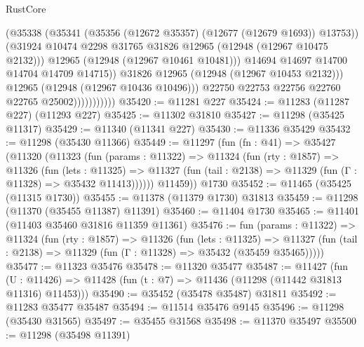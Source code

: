 \begin{lexlean}{RustCore}
\begin{coremodule}
                                  (@35338
                                    (@35341 (@35356 (@12672 @35357) (@12677 (@12679 @1693)) @13753))
                                    (@31924
                                      @10474
                                      @2298
                                      @31765
                                      @31826
                                      @12965
                                      (@12948 (@12967 @10475 @2132)))
                                    @12965
                                    (@12948 (@12967 @10461 @10481)))
                                  @14694
                                  @14697
                                  @14700
                                  @14704
                                  @14709
                                  @14715))
                              @31826
                              @12965
                              (@12948 (@12967 @10453 @2132)))
                            @12965
                            (@12948 (@12967 @10436 @10496)))
                          @22750
                          @22753
                          @22756
                          @22760
                          @22765
                          @25002)))))))))))
@35420 := @11281 @227
@35424 := @11283 (@11287 @227) (@11293 @227)
@35425 := @11302 @31810
@35427 := @11298 (@35425 @11317)
@35429 := @11340 (@11341 @227)
@35430 := @11336 @35429
@35432 := @11298 (@35430 @11366)
@35449 := @11297
    (fun (fn : @41) =>
    @35427
      (@11320
        (@11323
          (fun (params : @11322) =>
          @11324
            (fun (rty : @1857) =>
            @11326
              (fun (lets : @11325) =>
              @11327 (fun (tail : @2138) => @11329 (fun (Γ : @11328) => @35432 @11413))))))
        @11459))
    @1730
@35452 := @11465 (@35425 (@11315 @1730))
@35455 := @11378 (@11379 @1730) @31813
@35459 := @11298 (@11370 (@35455 @11387) @11391)
@35460 := @11404 @1730
@35465 := @11401 (@11403 @35460 @31816 @11359 @11361)
@35476 := fun (params : @11322) =>
  @11324
    (fun (rty : @1857) =>
    @11326
      (fun (lets : @11325) =>
      @11327 (fun (tail : @2138) => @11329 (fun (Γ : @11328) => @35432 (@35459 @35465)))))
@35477 := @11323 @35476
@35478 := @11320 @35477
@35487 := @11427
    (fun (U : @11426) => @11428 (fun (t : @7) => @11436 (@11298 (@11442 @31813 @11316) @11453)))
@35490 := @35452 (@35478 @35487) @31811
@35492 := @11283 @35477 @35487
@35494 := @11514 @35476 @9145
@35496 := @11298 (@35430 @31565)
@35497 := @35455 @31568
@35498 := @11370 @35497
@35500 := @11298 (@35498 @11391)

\end{coremodule}
\end{lexlean}
